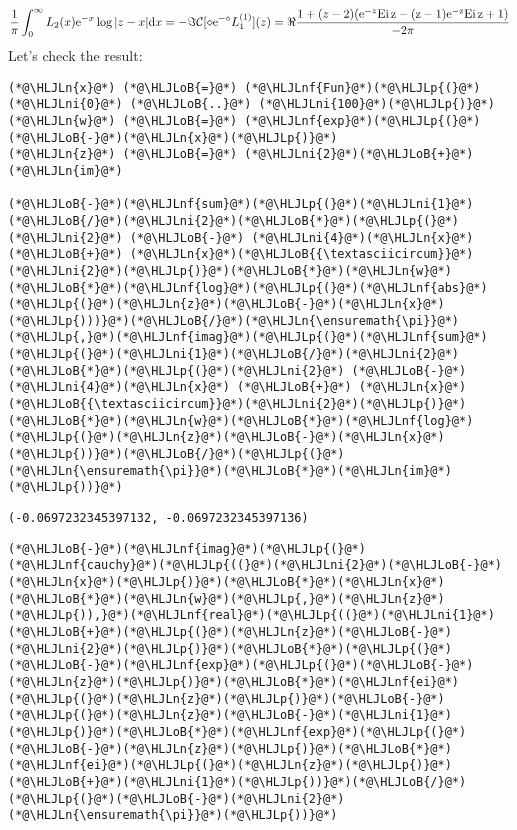 \documentclass[12pt,landscape]{article}
\newcommand{\HLJLn}[1]{#1}
\newcommand{\HLJLnf}[1]{\textcolor[RGB]{66,102,213}{#1}}
\newcommand{\HLJLni}[1]{\textcolor[RGB]{59,151,46}{#1}}
\newcommand{\HLJLoB}[1]{\textcolor[RGB]{102,102,102}{\textbf{#1}}}
\newcommand{\HLJLp}[1]{#1}
\def\D{ {\rm d} }
\def\E{ {\rm e} }
\def\CC{ {\cal C} }
\def\Ei{ {\rm Ei}\, }
\def\dx{\D x}
\def\Ei{\rm Ei\,}
\begin{document}
{\[
{1 \over \pi} \int_0^\infty L_2(x) \E^{-x} \log|z-x| \dx  = -\Im \CC[ \diamond \E^{-\diamond} L_1^{(1)}](z) = \Re{1  + (z-2) (\E^{-z} \Ei z - (z-1) \E^{-z} \Ei z +1) \over -2 \pi }
\]
Let's check the result:


\begin{lstlisting}
(*@\HLJLn{x}@*) (*@\HLJLoB{=}@*) (*@\HLJLnf{Fun}@*)(*@\HLJLp{(}@*)(*@\HLJLni{0}@*) (*@\HLJLoB{..}@*) (*@\HLJLni{100}@*)(*@\HLJLp{)}@*)
(*@\HLJLn{w}@*) (*@\HLJLoB{=}@*) (*@\HLJLnf{exp}@*)(*@\HLJLp{(}@*)(*@\HLJLoB{-}@*)(*@\HLJLn{x}@*)(*@\HLJLp{)}@*)
(*@\HLJLn{z}@*) (*@\HLJLoB{=}@*) (*@\HLJLni{2}@*)(*@\HLJLoB{+}@*)(*@\HLJLn{im}@*)

(*@\HLJLoB{-}@*)(*@\HLJLnf{sum}@*)(*@\HLJLp{(}@*)(*@\HLJLni{1}@*)(*@\HLJLoB{/}@*)(*@\HLJLni{2}@*)(*@\HLJLoB{*}@*)(*@\HLJLp{(}@*)(*@\HLJLni{2}@*) (*@\HLJLoB{-}@*) (*@\HLJLni{4}@*)(*@\HLJLn{x}@*) (*@\HLJLoB{+}@*) (*@\HLJLn{x}@*)(*@\HLJLoB{{\textasciicircum}}@*)(*@\HLJLni{2}@*)(*@\HLJLp{)}@*)(*@\HLJLoB{*}@*)(*@\HLJLn{w}@*)(*@\HLJLoB{*}@*)(*@\HLJLnf{log}@*)(*@\HLJLp{(}@*)(*@\HLJLnf{abs}@*)(*@\HLJLp{(}@*)(*@\HLJLn{z}@*)(*@\HLJLoB{-}@*)(*@\HLJLn{x}@*)(*@\HLJLp{)))}@*)(*@\HLJLoB{/}@*)(*@\HLJLn{\ensuremath{\pi}}@*)(*@\HLJLp{,}@*)(*@\HLJLnf{imag}@*)(*@\HLJLp{(}@*)(*@\HLJLnf{sum}@*)(*@\HLJLp{(}@*)(*@\HLJLni{1}@*)(*@\HLJLoB{/}@*)(*@\HLJLni{2}@*)(*@\HLJLoB{*}@*)(*@\HLJLp{(}@*)(*@\HLJLni{2}@*) (*@\HLJLoB{-}@*) (*@\HLJLni{4}@*)(*@\HLJLn{x}@*) (*@\HLJLoB{+}@*) (*@\HLJLn{x}@*)(*@\HLJLoB{{\textasciicircum}}@*)(*@\HLJLni{2}@*)(*@\HLJLp{)}@*)(*@\HLJLoB{*}@*)(*@\HLJLn{w}@*)(*@\HLJLoB{*}@*)(*@\HLJLnf{log}@*)(*@\HLJLp{(}@*)(*@\HLJLn{z}@*)(*@\HLJLoB{-}@*)(*@\HLJLn{x}@*)(*@\HLJLp{))}@*)(*@\HLJLoB{/}@*)(*@\HLJLp{(}@*)(*@\HLJLn{\ensuremath{\pi}}@*)(*@\HLJLoB{*}@*)(*@\HLJLn{im}@*)(*@\HLJLp{))}@*)
\end{lstlisting}

\begin{lstlisting}
(-0.0697232345397132, -0.0697232345397136)
\end{lstlisting}


\begin{lstlisting}
(*@\HLJLoB{-}@*)(*@\HLJLnf{imag}@*)(*@\HLJLp{(}@*)(*@\HLJLnf{cauchy}@*)(*@\HLJLp{((}@*)(*@\HLJLni{2}@*)(*@\HLJLoB{-}@*)(*@\HLJLn{x}@*)(*@\HLJLp{)}@*)(*@\HLJLoB{*}@*)(*@\HLJLn{x}@*)(*@\HLJLoB{*}@*)(*@\HLJLn{w}@*)(*@\HLJLp{,}@*)(*@\HLJLn{z}@*)(*@\HLJLp{)),}@*)(*@\HLJLnf{real}@*)(*@\HLJLp{((}@*)(*@\HLJLni{1}@*)(*@\HLJLoB{+}@*)(*@\HLJLp{(}@*)(*@\HLJLn{z}@*)(*@\HLJLoB{-}@*)(*@\HLJLni{2}@*)(*@\HLJLp{)}@*)(*@\HLJLoB{*}@*)(*@\HLJLp{(}@*)(*@\HLJLoB{-}@*)(*@\HLJLnf{exp}@*)(*@\HLJLp{(}@*)(*@\HLJLoB{-}@*)(*@\HLJLn{z}@*)(*@\HLJLp{)}@*)(*@\HLJLoB{*}@*)(*@\HLJLnf{ei}@*)(*@\HLJLp{(}@*)(*@\HLJLn{z}@*)(*@\HLJLp{)}@*)(*@\HLJLoB{-}@*)(*@\HLJLp{(}@*)(*@\HLJLn{z}@*)(*@\HLJLoB{-}@*)(*@\HLJLni{1}@*)(*@\HLJLp{)}@*)(*@\HLJLoB{*}@*)(*@\HLJLnf{exp}@*)(*@\HLJLp{(}@*)(*@\HLJLoB{-}@*)(*@\HLJLn{z}@*)(*@\HLJLp{)}@*)(*@\HLJLoB{*}@*)(*@\HLJLnf{ei}@*)(*@\HLJLp{(}@*)(*@\HLJLn{z}@*)(*@\HLJLp{)}@*)(*@\HLJLoB{+}@*)(*@\HLJLni{1}@*)(*@\HLJLp{))}@*)(*@\HLJLoB{/}@*)(*@\HLJLp{(}@*)(*@\HLJLoB{-}@*)(*@\HLJLni{2}@*)(*@\HLJLn{\ensuremath{\pi}}@*)(*@\HLJLp{))}@*)
\end{lstlisting}

}
\end{document}
